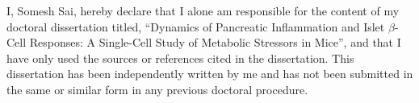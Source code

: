 
\begin{declaration}



\vspace{1cm}
I, Somesh Sai, hereby declare that I alone am responsible for the content of my doctoral dissertation titled, ``Dynamics of Pancreatic Inflammation and Islet $\beta$-Cell Responses: A Single-Cell Study of Metabolic Stressors in Mice'', and that I have only used the sources or references cited in the dissertation. This dissertation has been independently written by me and has not been submitted in the same or similar form in any previous doctoral procedure.


\end{declaration}

